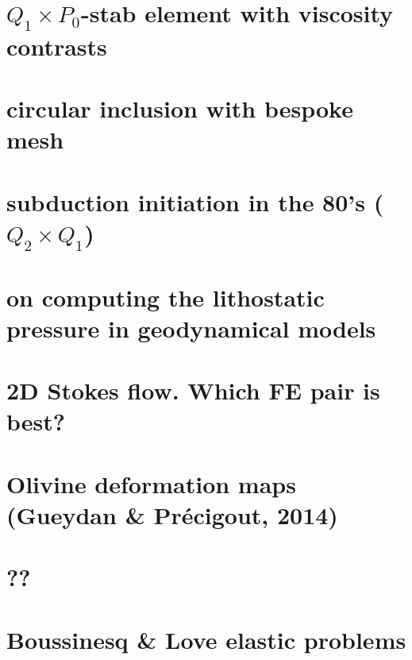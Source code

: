 \documentclass[a4paper,11pt]{report}
\begin{document}
\chapter{$Q_1\times P_0$-stab element with viscosity contrasts\label{f116}}

\chapter{circular inclusion with bespoke mesh \label{f117}}

\chapter{subduction initiation in the 80's ($Q_2\times Q_1$) \label{f118}}

\chapter{on computing the lithostatic pressure in geodynamical models \label{f119}}

\chapter{2D Stokes flow. Which FE pair is best? \label{f120}}

\chapter{Olivine deformation maps (Gueydan \& Pr{\'e}cigout, 2014)  \label{f121}}

\chapter{??\label{f122}}

\chapter{Boussinesq \& Love elastic problems\label{f123}}
\end{document}

